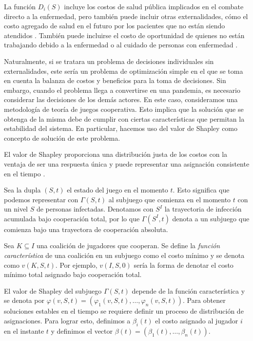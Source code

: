 \documentclass[11pt, oneside]{article}
\begin{document}
La función $D_i(S)$ incluye los costos de salud pública implicados en el combate directo a la enfermedad, pero también puede incluir otras externalidades, cómo el costo agregado de salud en el futuro por los pacientes que no están siendo atendidos \cite{alguien}. También puede incluirse el costo de oportunidad de quienes no están trabajando debido a la enfermedad o al cuidado de personas con enfermedad \cite{}.
 
 
Naturalmente, si se tratara un problema de decisiones individuales sin externalidades, este sería un problema de optimización simple en el que se toma en cuenta la balanza de costos y beneficios para la toma de decisiones. Sin embargo, cuando el problema llega a convertirse en una pandemia, es necesario considerar las decisiones de los demás actores. En este caso, consideramos una metodología de teoría de juegos cooperativa. Esto implica que la solución que se obtenga de la misma debe de cumplir con ciertas características que permitan la estabilidad del sistema. En particular, hacemos uso del valor de Shapley \cite{shapley} como concepto de solución de este problema.

El valor de Shapley proporciona una distribución justa de los costos con la ventaja de ser una respuesta única y puede representar una asignación consistente en el tiempo \cite{Petrosjan}.

Sea la dupla $(S,t)$ el estado del juego en el momento $t$. Esto significa que podemos representar con $\Gamma(S,t)$ al subjuego que comienza en el momento $t$ con un nivel $S$ de personas infectadas. Denotamos con $S^I$ la trayectoria de infección acumulada bajo cooperación total, por lo que $\Gamma(S^I,t)$ denota a un subjuego que comienza bajo una trayectora de cooperación absoluta.

Sea $K \subseteq I$ una coalición de jugadores que cooperan. Se define la \emph{función característica} de una coalición en un subjuego como el costo mínimo y se denota como $v(K,S,t)$. Por ejemplo, $v(I,S,0)$ sería la forma de denotar el costo mínimo total asignado bajo cooperación total.

El valor de Shapley del subjuego $\Gamma(S,t)$ depende de la función característica y se denota por $\varphi(v,S,t) = (\varphi_1(v,S,t),\dots,\varphi_n(v,S,t))$. Para obtener soluciones estables en el tiempo se requiere definir un proceso de distribución de asignaciones. Para lograr esto, definimos a $\beta_i(t)$ el costo asignado al jugador $i$ en el instante $t$ y definimos el vector $\beta(t) = (\beta_1(t),\dots, \beta_n(t))$.
\end{document}
